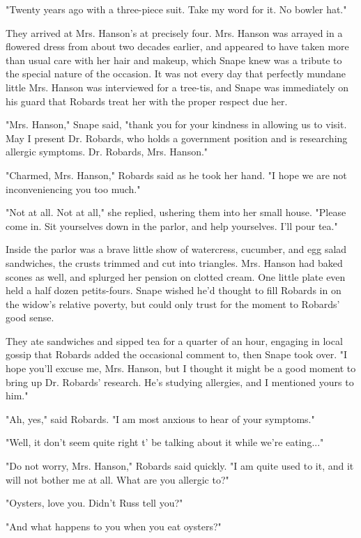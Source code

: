 \documentclass[a4paper,11pt]{article}
\begin{document}
"Twenty years ago with a three-piece suit. Take my word for it. No bowler hat."

They arrived at Mrs. Hanson's at precisely four. Mrs. Hanson was arrayed in a flowered dress from about two decades earlier, and appeared to have taken more than usual care with her hair and makeup, which Snape knew was a tribute to the special nature of the occasion. It was not every day that perfectly mundane little Mrs. Hanson was interviewed for a tree-tis, and Snape was immediately on his guard that Robards treat her with the proper respect due her.

"Mrs. Hanson," Snape said, "thank you for your kindness in allowing us to visit. May I present Dr. Robards, who holds a government position and is researching allergic symptoms. Dr. Robards, Mrs. Hanson."

"Charmed, Mrs. Hanson," Robards said as he took her hand. "I hope we are not inconveniencing you too much."

"Not at all. Not at all," she replied, ushering them into her small house. "Please come in. Sit yourselves down in the parlor, and help yourselves. I'll pour tea."

Inside the parlor was a brave little show of watercress, cucumber, and egg salad sandwiches, the crusts trimmed and cut into triangles. Mrs. Hanson had baked scones as well, and splurged her pension on clotted cream. One little plate even held a half dozen petits-fours. Snape wished he'd thought to fill Robards in on the widow's relative poverty, but could only trust for the moment to Robards' good sense.

They ate sandwiches and sipped tea for a quarter of an hour, engaging in local gossip that Robards added the occasional comment to, then Snape took over. "I hope you'll excuse me, Mrs. Hanson, but I thought it might be a good moment to bring up Dr. Robards' research. He's studying allergies, and I mentioned yours to him."

"Ah, yes," said Robards. "I am most anxious to hear of your symptoms."

"Well, it don't seem quite right t' be talking about it while we're eating..."

"Do not worry, Mrs. Hanson," Robards said quickly. "I am quite used to it, and it will not bother me at all. What are you allergic to?"

"Oysters, love you. Didn't Russ tell you?"

"And what happens to you when you eat oysters?"
\end{document}
